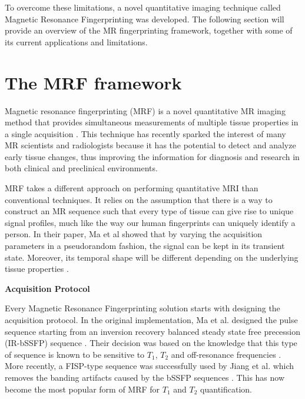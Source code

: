 \hfill

To overcome these limitations, a novel quantitative imaging technique called Magnetic Resonance Fingerprinting was developed.
The following section will provide an overview of the MR fingerprinting framework, together with some of its current applications and limitations.

\hfill

\section{The MRF framework}\label{chapterlabel2sec22}

Magnetic resonance fingerprinting (MRF) is a novel quantitative MR imaging method that provides simultaneous measurements of multiple tissue properties in a single acquisition \cite{Ma2013}. 
This technique has recently sparked the interest of many MR scientists and radiologists because it has the potential to detect and analyze early tissue changes, thus improving the information for diagnosis and research in both clinical and preclinical environments. 

\hfill

MRF takes a different approach on performing quantitative MRI than conventional techniques. 
It relies on the assumption that there is a way to construct an MR sequence such that every type of tissue can give rise to unique signal profiles, much like the way our human fingerprints can uniquely identify a person.
In their paper, Ma et al showed that by varying the acquisition parameters in a pseudorandom fashion, the signal can be kept in its transient state.
Moreover, its temporal shape will be different depending on the underlying tissue properties \cite{Ma2013}.

\hfill

\large \textbf{Acquisition Protocol} \normalsize

Every Magnetic Resonance Fingerprinting solution starts with designing the acquisition protocol.
In the original implementation, Ma et al. designed the pulse sequence starting from an inversion recovery balanced steady state free precession (IR-bSSFP) sequence \cite{Ma2013}.
Their decision was based on the knowledge that this type of sequence is known to be sensitive to $T_1$, $T_2$ and off-resonance frequencies \cite{Schmitt2006}.
More recently, a FISP-type sequence was successfully used by Jiang et al. which removes the banding artifacts caused by the bSSFP sequences \cite{Jiang2015}. 
This has now become the most popular form of MRF for $T_1$ and $T_2$ quantification.

